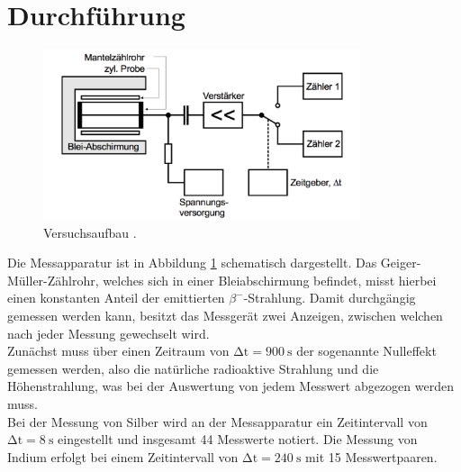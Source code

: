\section{Durchführung}

\begin{figure}[H]
  \centering
  \includegraphics[height=5cm]{Aufbau.png}
  \caption{Versuchsaufbau \cite{skript}.}
  \label{fig:aufbau}
\end{figure}
Die Messapparatur ist in Abbildung \ref{fig:aufbau}
schematisch dargestellt. Das Geiger-Müller-Zählrohr, welches sich in einer Bleiabschirmung
befindet, misst hierbei einen konstanten Anteil der emittierten $\beta^-$-Strahlung.
Damit durchgängig gemessen werden kann, besitzt das Messgerät zwei Anzeigen, zwischen
welchen nach jeder Messung gewechselt wird.\\
Zunächst muss über einen Zeitraum von $\increment\text{t} = \SI{900}{\second}$ der sogenannte
Nulleffekt gemessen werden, also die natürliche radioaktive Strahlung und die Höhenstrahlung,
was bei der Auswertung von jedem Messwert abgezogen werden muss. \\
Bei der Messung von Silber wird an der Messapparatur ein Zeitintervall von $\increment\text{t} = \SI{8}{\second}$
eingestellt und insgesamt 44 Messwerte notiert.
Die Messung von Indium erfolgt bei einem Zeitintervall von $\increment\text{t} = \SI{240}{\second}$
mit 15 Messwertpaaren.
